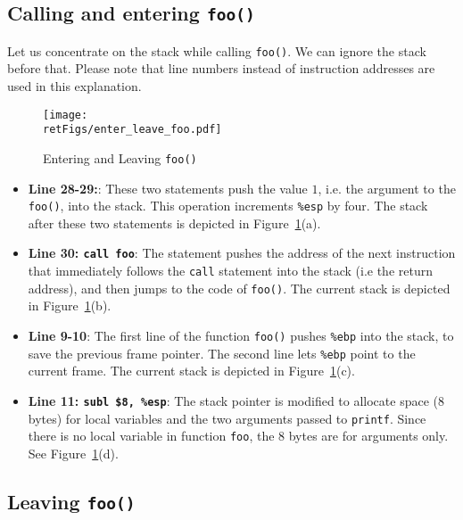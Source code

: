 \subsection{Calling and entering {\tt foo()}}

Let us concentrate on the stack while calling {\tt foo()}. We can ignore the stack
before that. Please note that line numbers instead of instruction addresses are
used in this explanation. 



\begin{figure}[htb]
	\centering
	\texttt{[image: \\retFigs/enter\_leave\_foo.pdf]}
	\caption{Entering and Leaving {\tt foo()}}
	\label{fig:enter_leave_foo}
\end{figure}


\begin{itemize}
\item \textbf{Line 28-29:}:
These two statements push the value $1$, i.e. the argument to the {\tt foo()}, 
into the stack. This operation increments {\tt \%esp} by four. The stack
after these two statements is depicted in Figure~\ref{fig:enter_leave_foo}(a).

\item \textbf{Line 30: \texttt{call foo}}: 
The statement pushes the address of the next instruction that 
immediately follows the {\tt call} statement into the 
stack (i.e the return address), and then jumps to the 
code of {\tt foo()}. 
The current stack is depicted in Figure~\ref{fig:enter_leave_foo}(b).

\item \textbf{Line 9-10}:
The first line of the function {\tt foo()} pushes {\tt \%ebp} into
the stack, to save the previous frame pointer. The second
line lets {\tt \%ebp} point to the current frame. The current stack 
is depicted in Figure~\ref{fig:enter_leave_foo}(c). 

\item \textbf{Line 11: \texttt{subl \$8, \%esp}}:
The stack pointer is modified to allocate space (8 bytes) for 
local variables and the two arguments passed to {\tt printf}. 
Since there is no local variable in function {\tt foo}, the
8 bytes are for arguments only. 
See Figure~\ref{fig:enter_leave_foo}(d). 

\end{itemize}


\subsection{Leaving {\tt foo()}}

